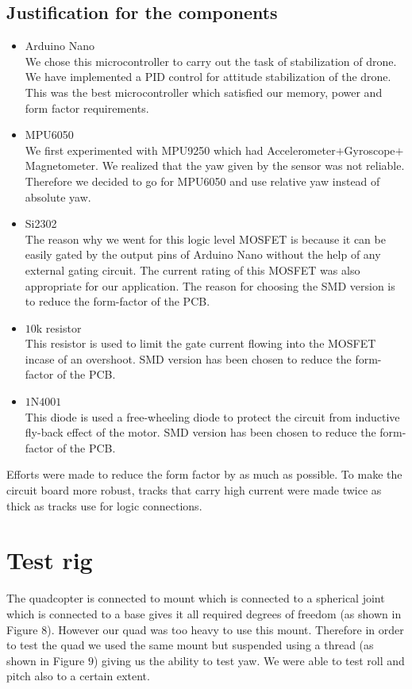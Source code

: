\documentclass[9pt]{article}
\begin{document}
\subsection{Justification for the components}
\begin{itemize}
\item Arduino Nano\\
We chose this microcontroller to carry out the task of stabilization of drone. We have implemented a PID control for attitude stabilization of the drone. This was the best microcontroller which satisfied our memory, power and form factor requirements.

\item MPU6050\\
We first experimented with MPU9250 which had Accelerometer$+$Gyroscope$+$Magnetometer. We realized that the yaw given by the sensor was not reliable. Therefore we decided to go for MPU6050 and use relative yaw instead of absolute yaw.

\item Si2302\\
The reason why we went for this logic level MOSFET is because it can be easily gated by the output pins of Arduino Nano without the help of any external gating circuit. The current rating of this MOSFET was also appropriate for our application. The reason for choosing the SMD version is to reduce the form-factor of the PCB.

\item $10$k resistor\\
This resistor is used to limit the gate current flowing into the MOSFET incase of an overshoot. SMD version has been chosen to reduce the form-factor of the PCB.

\item $1$N$4001$\\
This diode is used a free-wheeling diode to protect the circuit from inductive fly-back effect of the motor. SMD version has been chosen to reduce the form-factor of the PCB.
   
\end{itemize}
\noindent Efforts were made to reduce the form factor by as much as possible. To make the circuit board more robust, tracks that carry high current were made twice as thick as tracks use for logic connections.
 
\section{Test rig}
The quadcopter is connected to mount which is connected to a spherical joint which is connected to a base gives it all required degrees of freedom (as shown in Figure $8$). However our quad was too heavy to use this mount. Therefore in order to test the quad we used the same mount but suspended using a thread (as shown in Figure $9$) giving us the ability to test yaw. We were able to test roll and pitch also to a certain extent.
\end{document}
